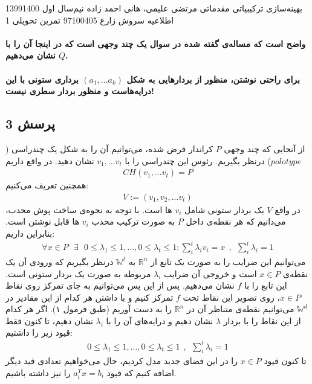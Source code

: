 \documentclass[a4paper,12pt]{article}
\newcounter{problemcounter}
\newcounter{subproblemcounter}
\newcommand{\problem}[1]
{
	\subsection*{
		پرسش
		#1
	}
}
\begin{document}
\handout
{بهینه‌سازی ترکیبیاتی مقدماتی}
{مرتضی علیمی، هانی احمد زاده}
{نیم‌سال اول 1399\lr{-}1400}
{اطلاعیه}
{سروش زارع}
{97100405}
 {تمرین تحویلی 1}
\paragraph{\color{red}واضح است که مساله‌ی گفته شده در سوال یک چند وجهی است که در اینجا آن را با $Q$ نشان می‌دهیم.
}
\paragraph{\color{red} برای راحتی نوشتن، منظور از بردار‌هایی به شکل $(a_1, ... a_k)$ برداری ستونی با این درایه‌هاست و منظور بردار سطری نیست!}

\problem{3}
از آنجایی که چند وجهی $P$ کراندار فرض شده، می‌توانیم آن را به شکل یک چندراسی ($polotype$) درنظر بگیریم. رئوس این چندراسی را با
$v_1, ... v_t$
نشان دهید. در واقع داریم
\begin{align*}
CH(v_1, ... v_t) = P	
\end{align*}
همچنین تعریف می‌کنیم:
\begin{align*}
	V := (v_1, v_2, ... v_t)
\end{align*}
در واقع $V$ یک بردار ستونی شامل $v_i$ ها است.
\newline
با توجه به نحوه‌ی ساخت پوش محدب، می‌دانیم که هر نقطه‌ی داخل $P$ به صورت ترکیب محدب $v_i$ ها قابل نوشتن است. بنابراین داریم:
\begin{align}
	\forall x \in P \ \ \  \exists \ \ \  0 \leq \lambda_1 \leq 1, ..., 0 \leq \lambda_t \leq 1: \sum_i^t \lambda_iv_i = x	 \ \ , \ \ \sum_i^t \lambda_i = 1
\end{align}
می‌توانیم این ضرایب را به صورت یک تابع از 
$\mathbb{R}^n$
به
$\mathbb{W}^t$
درنظر بگیریم که ورودی آن یک نقطه‌ی
$x \in P$
است و خروجی آن ضرایب $\lambda_i$ مربوطه به صورت یک بردار ستونی است. این تابع را با $f$ نشان می‌دهیم. پس از این پس می‌توانیم به جای تمرکز روی نقاط $x \in P$، روی تصویر این نقاط تحت $f$ تمرکز کنیم و با داشتن هر کدام از این مقادیر در $\mathbb{W}^d$ می‌توانیم نقطه‌ی متناظر آن در $\mathbb{R}^n$ را به دست آوریم (طبق فرمول ۱). اگر هر کدام از این نقاط را با بردار $\lambda$ نشان دهیم و درایه‌های آن را با $\lambda_i$ نشان دهیم، تا کنون فقط قیود زیر را داشتیم:
\begin{align*}
	0 \leq \lambda_1 \leq 1, ..., 0 \leq \lambda_t \leq 1 \ \ , \ \ \sum_i^t \lambda_i = 1
\end{align*}
تا کنون قیود $x \in P$ را در این فضای جدید مدل کردیم، حال می‌خواهیم تعدادی قید دیگر اضافه کنیم که قیود $a_i^Tx = b_i$ را نیز داشته باشیم.
\end{document}
